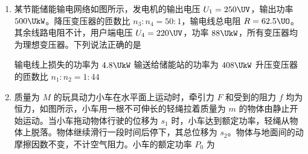 \documentclass[\gkver]{gaokaozhenti}
\begin{document}
\begin{enumerate}
{解得 $v_{R}=11 \Ums$

联立解得 $v_{T}=1 \Ums$

故选 C。
}

\item
某节能储能输电网络如图所示，发电机的输出电压 $U_{1}=250 \UV$，输出功率 $500 \UkW$。降压变压器的匝数比 $n_{3}:n_{4}=50:1$，输电线总电阻 $R=62.5 \UO$。其余线路电阻不计，用户端电压 $U_{4}=220 \UV$，功率 $88 \UkW$，所有变压器均为理想变压器。下列说法正确的是


{输电线上损失的功率为 $4.8 \UkW$}
{输送给储能站的功率为 $408 \UkW$}
{升压变压器的匝数比 $n_{1}:n_{2}=1:44$}


\item
质量为 $M$ 的玩具动力小车在水平面上运动时，牵引力 $F$ 和受到的阻力 $f$ 均为恒力，如图所示，小车用一根不可伸长的轻绳拉着质量为 $m$ 的物体由静止开始运动。当小车拖动物体行驶的位移为 $s_{1}$ 时，小车达到额定功率，轻绳从物体上脱落。物体继续滑行一段时间后停下，其总位移为 $s_{2}$。物体与地面间的动摩擦因数不变，不计空气阻力。小车的额定功率 $P_{0}$ 为


\end{enumerate}
\end{document}
